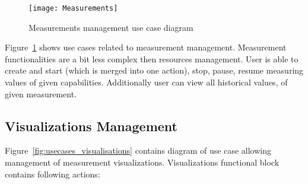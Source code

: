 \begin{figure}[ht]
   \centering
   \texttt{[image: Measurements]}
   \caption{Measurements management use case diagram}
   \label{fig:usecases_measurements}
 \end{figure}

Figure~\ref{fig:usecases_measurements} shows use cases related to measurement management. Measurement functionalities
are a bit less complex then resources management. User is able to create and start (which is merged into one action),
stop, pause, resume measuring values of given capabilities. Additionally user can view all historical values, of given
measurement.

\subsection{Visualizations Management}
\label{subsec:visualizations_mgmnt}

Figure~\ref{fig:usecases_visualisations} contains diagram of use case allowing management of measurement
visualizations. Visualizations functional block contains following actions:


